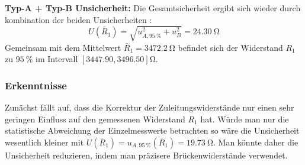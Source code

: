 \textbf{Typ-A + Typ-B Unsicherheit:} Die Gesamtsicherheit ergibt sich wieder durch kombination der beiden Unsicherheiten \cite[S.~14, Gl.~1.22]{EMTPraktikum2025}:
\[
	U(\bar{R}_1) = \sqrt{u_{A,\SI{95}{\percent}}^2 + u_B^2} = \SI{24.30}{\ohm}
\]
Gemeinsam mit dem Mittelwert $\bar{R}_1=\SI{3472.2}{\ohm}$ befindet sich der Widerstand $R_1$ zu $\SI{95}{\percent}$ im Intervall $[3447.90, 3496.50]\si{\ohm}$.

\subsubsection{Erkenntnisse}

Zunächst fällt auf, dass die Korrektur der Zuleitungswiderstände nur einen sehr
geringen Einfluss auf den gemessenen Widerstand $R_1$ hat. Würde man nur die statistische Abweichung der Einzelmesswerte betrachten so wäre die Unsicherheit wesentlich kleiner mit $U(\bar{R}_1) = u_{A,\SI{95}{\percent}}(\bar{R}_1) = \SI{19.73}{\ohm}$. Man könnte daher die Unsicherheit reduzieren, indem man präzisere Brückenwiderstände verwendet.
